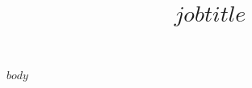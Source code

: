 \documentclass[11pt,a4paper,sans]{moderncv}
\title{$jobtitle$}
\begin{document}
\makecvtitle

$body$
\end{document}
